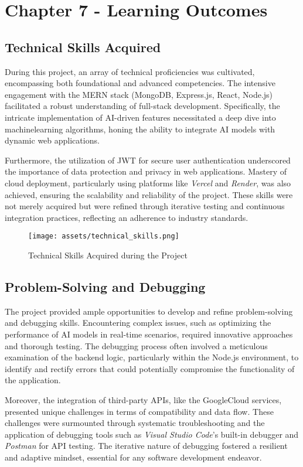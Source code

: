 \section{Chapter 7 - Learning Outcomes}
\subsection{Technical Skills Acquired}
During this project, an array of technical proficiencies was cultivated, encompassing both foundational and advanced competencies. The intensive engagement with the \gls{MERN} stack (\gls{MongoDB}, \gls{Express.js}, \gls{React}, \gls{Node.js}) facilitated a robust understanding of full-stack development. Specifically, the intricate implementation of \gls{AI}-driven features necessitated a deep dive into \gls{machinelearning} algorithms, honing the ability to integrate \gls{AI} models with dynamic web applications.

Furthermore, the utilization of \gls{JWT} for secure user authentication underscored the importance of data protection and privacy in web applications. Mastery of cloud deployment, particularly using platforms like \textit{Vercel} and \textit{Render}, was also achieved, ensuring the scalability and reliability of the project. These skills were not merely acquired but were refined through iterative testing and continuous integration practices, reflecting an adherence to industry standards.

\begin{figure}[h]
    \centering
    \texttt{[image: assets/technical\_skills.png]}
    \caption{Technical Skills Acquired during the Project}
    \label{fig:technical_skills}
\end{figure}

\subsection{Problem-Solving and Debugging}
The project provided ample opportunities to develop and refine problem-solving and debugging skills. Encountering complex issues, such as optimizing the performance of \gls{AI} models in real-time scenarios, required innovative approaches and thorough testing. The debugging process often involved a meticulous examination of the backend logic, particularly within the \gls{Node.js} environment, to identify and rectify errors that could potentially compromise the functionality of the application.

Moreover, the integration of third-party APIs, like the \gls{GoogleCloud} services, presented unique challenges in terms of compatibility and data flow. These challenges were surmounted through systematic troubleshooting and the application of debugging tools such as \textit{Visual Studio Code}'s built-in debugger and \textit{Postman} for API testing. The iterative nature of debugging fostered a resilient and adaptive mindset, essential for any software development endeavor.

